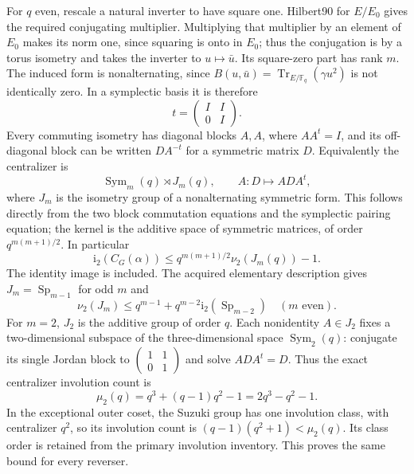 \documentclass[10pt]{article}
\newcommand{\ii}{\mathrm i_2}\newcommand{\nuu}{\nu_2}\newcommand{\F}{\mathbb F}\newcommand{\GL}{\operatorname{GL}}\newcommand{\GU}{\operatorname{GU}}\newcommand{\Sp}{\operatorname{Sp}}\newcommand{\PSp}{\operatorname{PSp}}\newcommand{\PGSp}{\operatorname{PGSp}}\newcommand{\Aut}{\operatorname{Aut}}
\begin{document}
For $q$ even, rescale a natural inverter to have square one. Hilbert90 for
$E/E_0$ gives the required conjugating multiplier. Multiplying that
multiplier by an element of $E_0$ makes its norm one, since squaring is
onto in $E_0$; thus the conjugation is by a torus isometry and takes the
inverter to $u\mapsto\bar u$.
Its square-zero part has rank $m$. The induced form is nonalternating,
since
$B(u,\bar u)=\operatorname{Tr}_{E/\F_q}(\gamma u^2)$ is not identically
zero. In a symplectic basis it is therefore
\[
 t=\begin{pmatrix}I&I\\0&I\end{pmatrix}.
\]
Every commuting isometry has diagonal blocks $A,A$, where $AA^t=I$, and
its off-diagonal block can be written $DA^{-t}$ for a symmetric matrix $D$.
Equivalently the centralizer is
\[
 \operatorname{Sym}_m(q)\rtimes J_m(q),
 \qquad A:D\longmapsto ADA^t,
\]
where $J_m$ is the isometry group of a nonalternating symmetric form.
This follows directly from the two block commutation equations and the
symplectic pairing equation; the kernel is the additive space of symmetric
matrices, of order $q^{m(m+1)/2}$. In particular
\begin{equation}\label{evenmu}
 \ii(C_G(\alpha))\le q^{m(m+1)/2}\nuu(J_m(q))-1.
\end{equation}
The identity image is included. The acquired elementary description gives
$J_m=\Sp_{m-1}$ for odd $m$ and
\[
 \nuu(J_m)\le q^{m-1}+q^{m-2}\ii(\Sp_{m-2})\quad(m\text{ even}).
\]
For $m=2$, $J_2$ is the additive group of order $q$. Each nonidentity
$A\in J_2$ fixes a two-dimensional subspace of the three-dimensional
space $\operatorname{Sym}_2(q)$: conjugate its single Jordan block to
$\left(\begin{smallmatrix}1&1\\0&1\end{smallmatrix}\right)$ and solve
$ADA^t=D$. Thus the exact centralizer involution count is
\begin{equation}\label{mu4even}
 \mu_2(q)=q^3+(q-1)q^2-1=2q^3-q^2-1.
\end{equation}
In the exceptional outer coset, the Suzuki group has one involution class,
with centralizer $q^2$, so its involution count is
$(q-1)(q^2+1)<\mu_2(q)$. Its class order is retained from the primary
involution inventory. This proves the same bound for every reverser.
\end{document}
